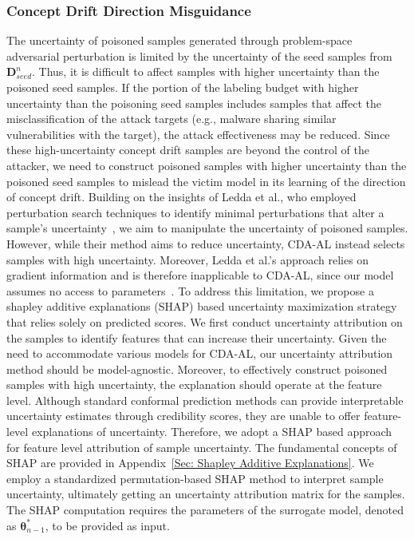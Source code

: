 \documentclass[lettersize,journal]{IEEEtran}
\begin{document}
\subsubsection{Concept Drift Direction Misguidance}
\label{Sec: Strategy II: Feature-Space Perturbation}
The uncertainty of poisoned samples generated through problem-space adversarial perturbation is limited by the uncertainty of the seed samples from $\bm{D}_{seed}^{n}$.
Thus, it is difficult to affect samples with higher uncertainty than the poisoned seed samples.
If the portion of the labeling budget with higher uncertainty than the poisoning seed samples includes samples that affect the misclassification of the attack targets (e.g., malware sharing similar vulnerabilities with the target), the attack effectiveness may be reduced.
Since these high-uncertainty concept drift samples are beyond the control of the attacker, we need to construct poisoned samples with higher uncertainty than the poisoned seed samples to mislead the victim model in its learning of the direction of concept drift.
Building on the insights of Ledda et al., who employed perturbation search techniques to identify minimal perturbations that alter a sample's uncertainty~\cite{Ledda_2023_ICCV}, we aim to manipulate the uncertainty of poisoned samples.
However, while their method aims to reduce uncertainty, CDA-AL instead selects samples with high uncertainty.
Moreover, Ledda et al.’s approach relies on gradient information and is therefore inapplicable to CDA-AL, since our model assumes no access to parameters~\cite{Ledda_2023_ICCV}.
To address this limitation, we propose a shapley additive explanations (SHAP) based uncertainty maximization strategy that relies solely on predicted scores.
We first conduct uncertainty attribution on the samples to identify features that can increase their uncertainty.
Given the need to accommodate various models for CDA-AL, our uncertainty attribution method should be model-agnostic.
Moreover, to effectively construct poisoned samples with high uncertainty, the explanation should operate at the feature level.
Although standard conformal prediction methods can provide interpretable uncertainty estimates through credibility scores, they are unable to offer feature-level explanations of uncertainty.
Therefore, we adopt a SHAP based approach for feature level attribution of sample uncertainty.
The fundamental concepts of SHAP are provided in Appendix~\ref{Sec: Shapley Additive Explanations}.
We employ a standardized permutation-based SHAP method to interpret sample uncertainty, ultimately getting an uncertainty attribution matrix for the samples.
The SHAP computation requires the parameters of the surrogate model, denoted as $\bm{\theta}_{n-1}^{*}$, to be provided as input.
\end{document}
